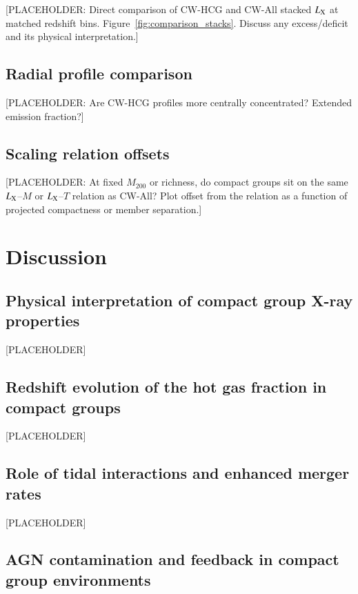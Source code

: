 \documentclass{aa}
\begin{document}
[PLACEHOLDER: Direct comparison of CW-HCG and CW-All stacked $L_{\rm X}$ at matched redshift bins. Figure~\ref{fig:comparison_stacks}. Discuss any excess/deficit and its physical interpretation.]

\subsection{Radial profile comparison}

[PLACEHOLDER: Are CW-HCG profiles more centrally concentrated? Extended emission fraction?]

\subsection{Scaling relation offsets}

[PLACEHOLDER: At fixed $M_{200}$ or richness, do compact groups sit on the same $L_{\rm X}$--$M$ or $L_{\rm X}$--$T$ relation as CW-All? Plot offset from the relation as a function of projected compactness or member separation.]

\section{Discussion}
\label{sec:discussion}

\subsection{Physical interpretation of compact group X-ray properties}

[PLACEHOLDER]

\subsection{Redshift evolution of the hot gas fraction in compact groups}

[PLACEHOLDER]

\subsection{Role of tidal interactions and enhanced merger rates}

[PLACEHOLDER]

\subsection{AGN contamination and feedback in compact group environments}
\end{document}
